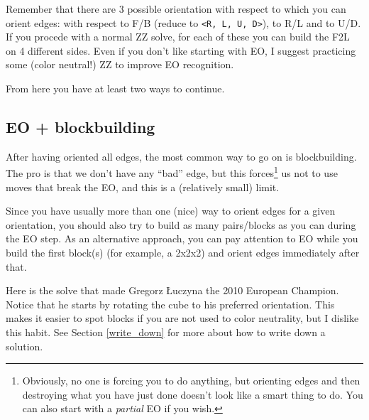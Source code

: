 \documentclass[11pt,a4paper]{book}
\newcommand{\m}{\texttt}
\begin{document}
Remember that there are 3 possible orientation with respect to which you can orient edges: with respect to F/B (reduce to \m{<R, L, U, D>}), to R/L and to U/D. If you procede with a normal ZZ solve, for each of these you can build the F2L on 4 different sides. Even if you don't like starting with EO, I suggest practicing some (color neutral!) ZZ to improve EO recognition.

From here you have at least two ways to continue.

\subsection{EO + blockbuilding} 

After having oriented all edges, the most common way to go on is blockbuilding. The pro is that we don't have any ``bad'' edge, but this forces\footnote{Obviously, no one is forcing you to do anything, but orienting edges and then destroying what you have just done doesn't look like a smart thing to do. You can also start with a \emph{partial} EO if you wish.} us not to use moves that break the EO, and this is a (relatively small) limit.

Since you have usually more than one (nice) way to orient edges for a given orientation, you should also try to build as many pairs/blocks as you can during the EO step. As an alternative approach, you can pay attention to EO while you build the first block(s) (for example, a 2x2x2) and orient edges immediately after that.

Here is the solve that made Gregorz Łuczyna the 2010 European Champion. Notice that he starts by rotating the cube to his preferred orientation. This makes it easier to spot blocks if you are not used to color neutrality, but I dislike this habit. See Section \ref{write_down} for more about how to write down a solution.
\end{document}
